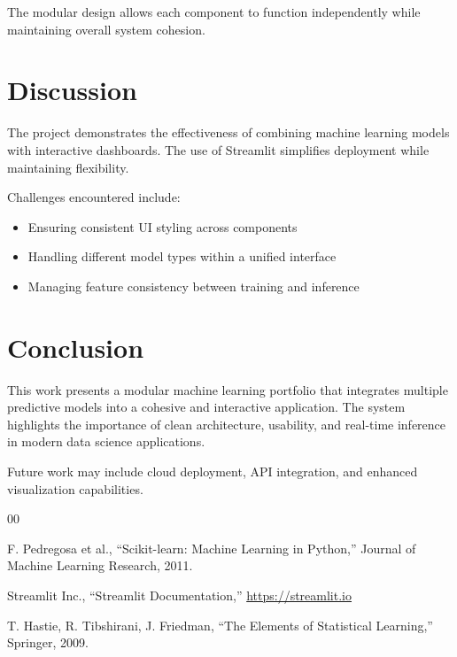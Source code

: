 \documentclass[conference]{IEEEtran}
\begin{document}
The modular design allows each component to function independently while maintaining overall system cohesion.

\section{Discussion}

The project demonstrates the effectiveness of combining machine learning models with interactive dashboards. The use of Streamlit simplifies deployment while maintaining flexibility.

Challenges encountered include:
\begin{itemize}
    \item Ensuring consistent UI styling across components
    \item Handling different model types within a unified interface
    \item Managing feature consistency between training and inference
\end{itemize}

\section{Conclusion}

This work presents a modular machine learning portfolio that integrates multiple predictive models into a cohesive and interactive application. The system highlights the importance of clean architecture, usability, and real-time inference in modern data science applications.

Future work may include cloud deployment, API integration, and enhanced visualization capabilities.

\begin{thebibliography}{00}

 F. Pedregosa et al., ``Scikit-learn: Machine Learning in Python,'' Journal of Machine Learning Research, 2011.

 Streamlit Inc., ``Streamlit Documentation,'' \url{https://streamlit.io}

 T. Hastie, R. Tibshirani, J. Friedman, ``The Elements of Statistical Learning,'' Springer, 2009.

\end{thebibliography}
\end{document}

